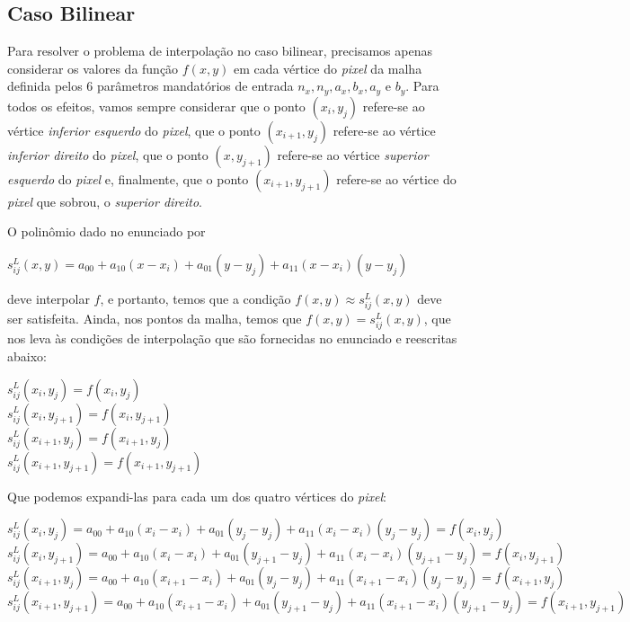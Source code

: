 \documentclass[11pt]{article}
\begin{document}
\subsection{Caso Bilinear}
  \indent\indent Para resolver o problema de interpolação no caso bilinear, precisamos apenas
  considerar os valores da função $f(x, y)$ em cada vértice do \textit{pixel} da
  malha definida pelos 6 parâmetros mandatórios de entrada $n_x, n_y, a_x, b_x, a_y$ e $b_y$.
  Para todos os efeitos, vamos sempre considerar que o ponto $(x_i, y_j)$ refere-se ao vértice
  \textit{inferior esquerdo} do \textit{pixel}, que o ponto $(x_{i + 1}, y_j)$ refere-se ao vértice
  \textit{inferior direito} do \textit{pixel}, que o ponto $(x, y_{j + 1})$ refere-se ao vértice
  \textit{superior esquerdo} do \textit{pixel} e, finalmente, que o ponto $(x_{i + 1}, y_{j + 1})$
  refere-se ao vértice do \textit{pixel} que sobrou, o \textit{superior direito}.

  O polinômio dado no enunciado por

  \begin{center}
    $s_{ij}^L(x, y) = a_{00} + a_{10}(x - x_i) + a_{01}(y - y_j) + a_{11}(x - x_i)(y - y_j)$
  \end{center}

  deve interpolar $f$, e portanto, temos que a condição $f(x, y) \approx s_{ij}^L(x, y)$ deve
  ser satisfeita. Ainda, nos pontos da malha, temos que $f(x, y) = s_{ij}^L(x, y)$, que nos
  leva às condições de interpolação que são fornecidas no enunciado e reescritas abaixo:

  \begin{center}
    $s_{ij}^L(x_i, y_j) = f(x_i, y_j)$ \\
    $s_{ij}^L(x_i, y_{j + 1}) = f(x_i, y_{j + 1})$ \\
    $s_{ij}^L(x_{i + 1}, y_j) = f(x_{i + 1}, y_j)$ \\
    $s_{ij}^L(x_{i + 1}, y_{j + 1}) = f(x_{i + 1}, y_{j + 1})$
  \end{center}

  Que podemos expandi-las para cada um dos quatro vértices do \textit{pixel}:

  \begin{center}
    $s_{ij}^L(x_i, y_j) = a_{00} + a_{10}(x_i - x_i) + a_{01}(y_j - y_j) + a_{11}(x_i - x_i)(y_j - y_j) = f(x_i, y_j)$ \\
    $s_{ij}^L(x_i, y_{j + 1}) = a_{00} + a_{10}(x_i - x_i) + a_{01}(y_{j + 1} - y_j) + a_{11}(x_i - x_i)(y_{j + 1} - y_j) = f(x_i, y_{j + 1})$ \\
    $s_{ij}^L(x_{i + 1}, y_j) = a_{00} + a_{10}(x_{i + 1} - x_i) + a_{01}(y_j - y_j) + a_{11}(x_{i + 1} - x_i)(y_j - y_j) = f(x_{i + 1}, y_j)$ \\
    $s_{ij}^L(x_{i + 1}, y_{j + 1}) = a_{00} + a_{10}(x_{i + 1} - x_i) + a_{01}(y_{j + 1} - y_j) + a_{11}(x_{i + 1} - x_i)(y_{j + 1} - y_j) = f(x_{i + 1}, y_{j + 1})$
  \end{center}
\end{document}
